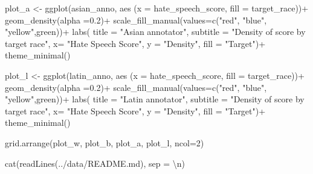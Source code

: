 \documentclass[
]{article}
\newenvironment{Shaded}{\begin{snugshade}}{\end{snugshade}}
\newcommand{\AttributeTok}[1]{\textcolor[rgb]{0.77,0.63,0.00}{#1}}
\newcommand{\DecValTok}[1]{\textcolor[rgb]{0.00,0.00,0.81}{#1}}
\newcommand{\FloatTok}[1]{\textcolor[rgb]{0.00,0.00,0.81}{#1}}
\newcommand{\FunctionTok}[1]{\textcolor[rgb]{0.00,0.00,0.00}{#1}}
\newcommand{\NormalTok}[1]{#1}
\newcommand{\OtherTok}[1]{\textcolor[rgb]{0.56,0.35,0.01}{#1}}
\newcommand{\SpecialCharTok}[1]{\textcolor[rgb]{0.00,0.00,0.00}{#1}}
\newcommand{\StringTok}[1]{\textcolor[rgb]{0.31,0.60,0.02}{#1}}
\begin{document}
\begin{Shaded}
\begin{Highlighting}[]
\NormalTok{plot\_a }\OtherTok{\textless{}{-}} \FunctionTok{ggplot}\NormalTok{(asian\_anno, }\FunctionTok{aes}\NormalTok{ (}\AttributeTok{x =}\NormalTok{ hate\_speech\_score, }\AttributeTok{fill =}\NormalTok{ target\_race))}\SpecialCharTok{+}
  \FunctionTok{geom\_density}\NormalTok{(}\AttributeTok{alpha =}\FloatTok{0.2}\NormalTok{)}\SpecialCharTok{+}
   \FunctionTok{scale\_fill\_manual}\NormalTok{(}\AttributeTok{values=}\FunctionTok{c}\NormalTok{(}\StringTok{"red"}\NormalTok{, }\StringTok{"blue"}\NormalTok{, }\StringTok{"yellow"}\NormalTok{,}\StringTok{\textquotesingle{}green\textquotesingle{}}\NormalTok{))}\SpecialCharTok{+}
  \FunctionTok{labs}\NormalTok{(}
    \AttributeTok{title =} \StringTok{"Asian annotator"}\NormalTok{, }
    \AttributeTok{subtitle =} \StringTok{"Density of score by target race"}\NormalTok{, }
    \AttributeTok{x=} \StringTok{"Hate Speech Score"}\NormalTok{, }
    \AttributeTok{y =} \StringTok{"Density"}\NormalTok{,}
    \AttributeTok{fill =} \StringTok{"Target"}\NormalTok{)}\SpecialCharTok{+}
  \FunctionTok{theme\_minimal}\NormalTok{()}

\NormalTok{plot\_l }\OtherTok{\textless{}{-}} \FunctionTok{ggplot}\NormalTok{(latin\_anno, }\FunctionTok{aes}\NormalTok{ (}\AttributeTok{x =}\NormalTok{ hate\_speech\_score, }\AttributeTok{fill =}\NormalTok{ target\_race))}\SpecialCharTok{+}
  \FunctionTok{geom\_density}\NormalTok{(}\AttributeTok{alpha =}\FloatTok{0.2}\NormalTok{)}\SpecialCharTok{+}
   \FunctionTok{scale\_fill\_manual}\NormalTok{(}\AttributeTok{values=}\FunctionTok{c}\NormalTok{(}\StringTok{"red"}\NormalTok{, }\StringTok{"blue"}\NormalTok{, }\StringTok{"yellow"}\NormalTok{,}\StringTok{\textquotesingle{}green\textquotesingle{}}\NormalTok{))}\SpecialCharTok{+}
  \FunctionTok{labs}\NormalTok{(}
    \AttributeTok{title =} \StringTok{"Latin annotator"}\NormalTok{, }
    \AttributeTok{subtitle =} \StringTok{"Density of score by target race"}\NormalTok{, }
    \AttributeTok{x=} \StringTok{"Hate Speech Score"}\NormalTok{, }
    \AttributeTok{y =} \StringTok{"Density"}\NormalTok{,}
    \AttributeTok{fill =} \StringTok{"Target"}\NormalTok{)}\SpecialCharTok{+}
  \FunctionTok{theme\_minimal}\NormalTok{()}

\FunctionTok{grid.arrange}\NormalTok{(plot\_w, plot\_b, plot\_a, plot\_l, }\AttributeTok{ncol=}\DecValTok{2}\NormalTok{)}

\FunctionTok{cat}\NormalTok{(}\FunctionTok{readLines}\NormalTok{(}\StringTok{\textquotesingle{}../data/README.md\textquotesingle{}}\NormalTok{), }\AttributeTok{sep =} \StringTok{\textquotesingle{}}\SpecialCharTok{\textbackslash{}n}\StringTok{\textquotesingle{}}\NormalTok{)}
\end{Highlighting}
\end{Shaded}
\end{document}
